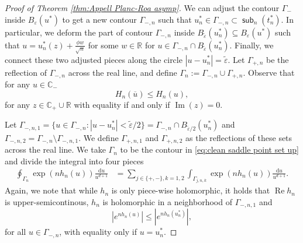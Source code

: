 \documentclass[reqno]{amsart}
\DeclareMathOperator{\sub}{\mathsf{sub}}
\newcommand{\1}{\mathbf{1}}
\newcommand{\dd}{\mathrm{d}}
\newcommand{\C}{\mathbb{C}}
\renewcommand\Re{\operatorname{Re}}
\renewcommand\Im{\operatorname{Im}}
\newcommand{\eps}{\varepsilon}
\newcommand{\R}{\mathbb{R}}
\def\R{\mathbb{R}}
\theoremstyle{plain}
\theoremstyle{definition}
\theoremstyle{remark}
\numberwithin{equation}{section}
\begin{document}
\begin{proof}[Proof of Theorem \ref{thm:Appell Planc-Roa asymp}]
		
				
		 We can adjust the contour $\Gamma_{-}$ inside $B_{\eps}(u^*)$ to get a new contour $\Gamma_{-,n}$ such that $u_{n}^*\in \Gamma_{-,n}\subset\sub_n(t_n^*)$. In particular, we deform the part of contour $\Gamma_{-,n}$ inside  $B_{\tilde{\eps}}(u_n^*)\subseteq B_{ {\eps}}(u^*)$ such that $u=u_{n}^{*}(z)+\frac{\phi w}{\sqrt{n}}$ for some $w\in\R$ for $u\in\Gamma_{-,n}\cap B_{\tilde\varepsilon}(u_n^*)$. Finally, we connect these two adjusted pieces along the circle $|u-u_{n}^*|=\tilde{\eps}$. Let $\Gamma_{+,n}$ be the reflection of $\Gamma_{-,n}$ across the real line, and define $\Gamma_{n}:=\Gamma_{-,n}\cup\Gamma_{+,n}$. Observe that for any $u\in\C_{-}$ \begin{equation}
			H_n(\overline{u})\leq H_{n}(u),
		\end{equation} for any $z\in\C_+\cup\R$ with equality if and only if $\Im(z)=0$. 
		
		Let $\Gamma_{-,n,1}=\{u\in \Gamma_{-,n}: |u-u_n^*|< \tilde{\eps}/2\}=\Gamma_{-,n}\cap B_{\tilde\varepsilon/2}(u_n^*)$ and $\Gamma_{-,n,2}=\Gamma_{-,n}\setminus\Gamma_{-,n,1}$. We define $\Gamma_{+,n,1}$ and $\Gamma_{+,n,2}$ as the reflections of these sets across the real line. We take $\Gamma_{n}$ to be the contour in \eqref{eq:clean saddle point set up} and divide the integral into four pieces \begin{equation}
		\begin{aligned}
			\oint_{\Gamma_{n}}\exp\left(n h_n(u) \right)\frac{\dd u}{u^{d+1}}&=\sum_{j\in\{+,-\},k=1,2}\int_{\Gamma_{j,n,k}}\exp\left(n h_n(u)\right)\frac{\dd u}{u^{d+1}}.
		\end{aligned}
		\end{equation} Again, we note that while $h_{n}$ is only piece-wise holomorphic, it holds that $\Re h_n$ is upper-semicontinous, $h_n$ is holomorphic in a neighborhood of $\Gamma_{-,n,1}$ and \begin{equation*}
		\left|e^{nh_{n}(u)}\right|\leq \left|e^{nh_{n}(u_{n}^*)}\right|,
		\end{equation*} for all $u\in\Gamma_{-,n}$, with equality only if $u=u_n^*$.
		

\end{proof}
\end{document}
